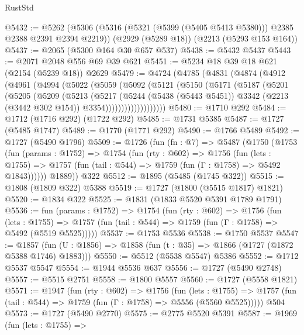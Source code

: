 \begin{lexlean}{RustStd}
\begin{coremodule}
@5432 := @5262
    (@5306 (@5316 (@5321 (@5399 (@5405 @5413 @5380))) @2385 @2388 @2391 @2394 @2219))
    (@2929 (@5289 @18))
    (@2213 (@5293 @153 @164))
@5437 := @2065 (@5300 @164 @30 @657 @537)
@5438 := @5432 @5437
@5443 := @2071 @2048 @556 @69 @39 @621
@5451 := @5234 @18 @39 @18 @621 (@2154 (@5239 @18)) @2629
@5479 := @4724
    (@4785
      (@4831
        (@4874
          (@4912
            (@4961
              (@4994
                (@5022
                  (@5059
                    (@5092
                      (@5121
                        (@5150
                          (@5171
                            (@5187
                              (@5201
                                (@5205
                                  (@5209
                                    (@5213
                                      (@5217
                                        (@5244
                                          (@5438 (@5443 @5451))
                                          @3342
                                          (@2213 (@3442 @302 @154))
                                          @3354)))))))))))))))))))
@5480 := @1710 @292
@5484 := @1712 (@1716 @292) (@1722 @292)
@5485 := @1731 @5385
@5487 := @1727 (@5485 @1747)
@5489 := @1770 (@1771 @292)
@5490 := @1766 @5489
@5492 := @1727 (@5490 @1796)
@5509 := @1726
    (fun (fn : @7) =>
    @5487
      (@1750
        (@1753
          (fun (params : @1752) =>
          @1754
            (fun (rty : @602) =>
            @1756
              (fun (lets : @1755) =>
              @1757 (fun (tail : @544) => @1759 (fun (Γ : @1758) => @5492 @1843))))))
        @1889))
    @322
@5512 := @1895 (@5485 (@1745 @322))
@5515 := @1808 (@1809 @322) @5388
@5519 := @1727 (@1800 (@5515 @1817) @1821)
@5520 := @1834 @322
@5525 := @1831 (@1833 @5520 @5391 @1789 @1791)
@5536 := fun (params : @1752) =>
  @1754
    (fun (rty : @602) =>
    @1756
      (fun (lets : @1755) =>
      @1757 (fun (tail : @544) => @1759 (fun (Γ : @1758) => @5492 (@5519 @5525)))))
@5537 := @1753 @5536
@5538 := @1750 @5537
@5547 := @1857 (fun (U : @1856) => @1858 (fun (t : @35) => @1866 (@1727 (@1872 @5388 @1746) @1883)))
@5550 := @5512 (@5538 @5547) @5386
@5552 := @1712 @5537 @5547
@5554 := @1944 @5536 @637
@5556 := @1727 (@5490 @2748)
@5557 := @5515 @2751
@5558 := @1800 @5557
@5560 := @1727 (@5558 @1821)
@5571 := @1947
    (fun (rty : @602) =>
    @1756
      (fun (lets : @1755) =>
      @1757 (fun (tail : @544) => @1759 (fun (Γ : @1758) => @5556 (@5560 @5525)))))
    @504
@5573 := @1727 (@5490 @2770)
@5575 := @2775 @5520 @5391
@5587 := @1969
    (fun (lets : @1755) =>

\end{coremodule}
\end{lexlean}
